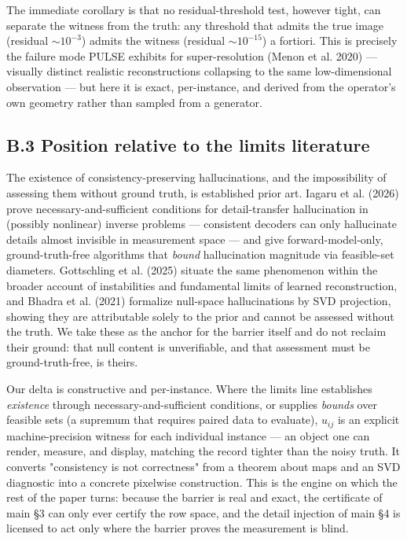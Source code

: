 \documentclass[11pt]{article}
\begin{document}
The immediate corollary is that no residual-threshold test, however tight, can separate the witness from the truth: any threshold that admits the true image (residual $\sim\!10^{-3}$) admits the witness (residual $\sim\!10^{-15}$) a fortiori. This is precisely the failure mode PULSE exhibits for super-resolution (Menon et al. 2020) --- visually distinct realistic reconstructions collapsing to the same low-dimensional observation --- but here it is exact, per-instance, and derived from the operator's own geometry rather than sampled from a generator.

\subsection*{B.3 Position relative to the limits literature}

The existence of consistency-preserving hallucinations, and the impossibility of assessing them without ground truth, is established prior art. Iagaru et al. (2026) prove necessary-and-sufficient conditions for detail-transfer hallucination in (possibly nonlinear) inverse problems --- consistent decoders can only hallucinate details almost invisible in measurement space --- and give forward-model-only, ground-truth-free algorithms that \textit{bound} hallucination magnitude via feasible-set diameters. Gottschling et al. (2025) situate the same phenomenon within the broader account of instabilities and fundamental limits of learned reconstruction, and Bhadra et al. (2021) formalize null-space hallucinations by SVD projection, showing they are attributable solely to the prior and cannot be assessed without the truth. We take these as the anchor for the barrier itself and do not reclaim their ground: that null content is unverifiable, and that assessment must be ground-truth-free, is theirs.

Our delta is constructive and per-instance. Where the limits line establishes \textit{existence} through necessary-and-sufficient conditions, or supplies \textit{bounds} over feasible sets (a supremum that requires paired data to evaluate), $u_{ij}$ is an explicit machine-precision witness for each individual instance --- an object one can render, measure, and display, matching the record tighter than the noisy truth. It converts "consistency is not correctness" from a theorem about maps and an SVD diagnostic into a concrete pixelwise construction. This is the engine on which the rest of the paper turns: because the barrier is real and exact, the certificate of main §3 can only ever certify the row space, and the detail injection of main §4 is licensed to act only where the barrier proves the measurement is blind.
\end{document}
